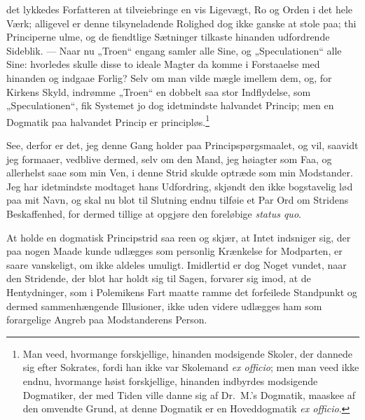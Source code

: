 det lykkedes Forfatteren at tilveiebringe en vis Ligevægt, Ro og
Orden i det hele Værk; alligevel er denne tilsyneladende Rolighed
dog ikke ganske at stole paa; thi Principerne ulme, og de
fiendtlige Sætninger tilkaste hinanden udfordrende Sideblik. ---
Naar nu „Troen“ engang samler alle Sine, og „Speculationen“ alle
Sine: hvorledes skulle disse to ideale Magter da komme i
Forstaaelse med hinanden og indgaae Forlig? Selv om man vilde
mægle imellem dem, og, for Kirkens Skyld, indrømme „Troen“ en
dobbelt saa stor Indflydelse, som „Speculationen“, fik Systemet jo
dog idetmindste halvandet Princip; men en Dogmatik paa halvandet
Princip er principløs.\footnote{Man veed, hvormange forskjellige,
hinanden modsigende Skoler, der dannede sig efter Sokrates, fordi
han ikke var Skolemand \textit{ex officio}; men man veed ikke
endnu, hvormange høist forskjellige, hinanden indbyrdes modsigende
Dogmatiker, der med Tiden ville danne sig af Dr.\ M.'s Dogmatik,
maaskee af den omvendte Grund, at denne Dogmatik er en
Hoveddogmatik \textit{ex officio}.}

See, derfor er det, jeg denne Gang holder paa
Principspørgsmaalet, og vil, saavidt jeg formaaer, vedblive
dermed, selv om den Mand, jeg høiagter som Faa, og allerhelst saae
som min Ven, i denne Strid skulde optræde som min Modstander. Jeg
har idetmindste modtaget hans Udfordring, skjøndt den ikke
bogstavelig
 lød paa mit Navn, og skal nu blot til Slutning endnu tilføie et
Par Ord om Stridens Beskaffenhed, for dermed tillige at opgjøre
den foreløbige \textit{status quo}.

At holde en dogmatisk Principstrid saa reen og skjær, at Intet
indsniger sig, der paa nogen Maade kunde udlægges som personlig
Krænkelse for Modparten, er saare vanskeligt, om ikke aldeles
umuligt. Imidlertid er dog Noget vundet, naar den Stridende, der
blot har holdt sig til Sagen, forvarer sig imod, at de
Hentydninger, som i Polemikens Fart maatte ramme det forfeilede
Standpunkt og dermed sammenhængende Illusioner, ikke uden videre
udlægges ham som forargelige Angreb paa Modstanderens Person.

